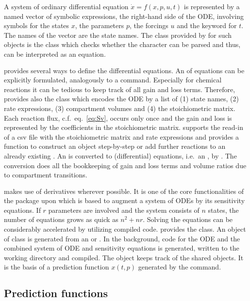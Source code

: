 \documentclass[article]{jss}
\begin{document}
A system of ordinary differential equation $\dot x = f(x, p, u, t)$ is represented by a named  vector of symbolic expressions, the right-hand side of the ODE, involving symbols for the states $x$, the parameters $p$, the forcings $u$ and the keyword  for $t$. The names of the vector are the state names. The class provided by  for such objects is the  class which checks whether the character can be parsed and thus, can be interpreted as an equation.

 provides several ways to define the differential equations. An  of equations can be explicitly formulated, analogously to a  command. Especially for chemical reactions it can be tedious to keep track of all gain and loss terms. Therefore,  provides also the  class which encodes the ODE by a list of (1) state names, (2) rate expressions, (3) compartment volumes and (4) the stoichiometric matrix. Each reaction flux, c.f.~eq.~\eqref{eq:Sv}, occurs only once and the gain and loss is represented by the coefficients in the stoichiometric matrix.  supports the read-in of a csv file with the stoichiometric matrix and rate expressions and provides a function  to construct an  object step-by-step or add further reactions to an already existing . An  is converted to (differential) equations, i.e.~an , by . The conversion does all the bookkeeping of gain and loss terms and volume ratios due to compartment transitions.

 makes use of derivatives wherever possible. It is one of the core functionalities of the  package upon which  is based to augment a system of ODEs by its sensitivity equations. If $r$ parameters are involved and the system consists of $n$ states, the number of equations grows as quick as $n^2 + nr$. Solving the equations can be considerably accelerated by utilizing compiled code.  provides the  class. An object of class  is generated from an  or . In the background,  code for the ODE and the combined system of ODE and sensitivity equations is generated, written to the working directory and compiled. The  object keeps track of the shared objects. It is the basis of a prediction function $x(t, p)$ generated by the  command.

\subsection{Prediction functions}
\end{document}
